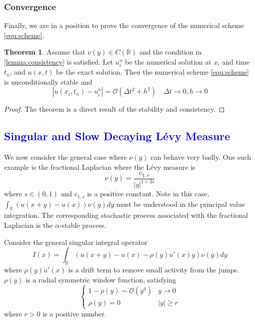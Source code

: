 \documentclass[10pt,a4paper]{article}
\newcommand{\RR}[0]{\mathbb{R}}
\newcommand{\lib}[1]{\textcolor{blue}{\section{#1}}}
\theoremstyle{definition}
\newtheorem{theorem}{Theorem}
\begin{document}
\subsubsection{Convergence}

Finally, we are in a position to prove the convergence of the numerical scheme \cref{equ:scheme}. 

\begin{theorem}
	Assume that $\nu(y)\in C(\RR)$ and the condition in \cref{lemma:consistency} is satisfied. Let $u_i^n$ be the numerical solution at $x_i$ and time $t_n$, and $u(x, t)$ be the exact solution. Then the numerical scheme \cref{equ:scheme} is unconditionally stable and 
	\begin{equation}
		|u(x_i,t_n)-u_i^n| = \mathcal{O}(\Delta t^2 + h^2) \quad \Delta t \rightarrow 0, h\rightarrow 0
	\end{equation}
\end{theorem}
\begin{proof}
	The theorem is a direct result of the stability and consistency. 
\end{proof}

\lib{Singular and Slow Decaying L\'evy Measure}\label{sect:extension}

We now consider the general case where $\nu(y)$ can behave very badly. One such example is the fractional Laplacian where the L\'evy measure is 
\begin{equation}
	\nu(y) = \frac{c_{1,s}}{|y|^{1+2s}}
\end{equation}
where $s\in (0,1)$ and $c_{1,s}$ is a positive constant. Note in this case, $\int_{\RR}(u(x+y)-u(x))\nu(y)dy$ must be understood in the principal value integration. The corresponding stochastic process associated with the fractional Laplacian is the $\alpha$-stable process. 

Consider the general singular integral operator
\begin{equation}\label{equ:Ix}
	I(x) = \int_{\RR}(u(x+y)-u(x)-\rho(y)u'(x)y)\nu(y)dy
\end{equation}
where $\rho(y)u'(x)$ is a drift term to remove small activity from the jumps. $\rho(y)$ is a radial symmetric window function, satisfying
\begin{equation}\label{equ:rho_condition}
\begin{cases}
	1-\rho(y)\sim \mathcal{O}(y^4)& y\rightarrow 0\\
	\rho(y)=0 & |y|\geq r
\end{cases}
\end{equation}
where $r>0$ is a positive number. 
\end{document}
